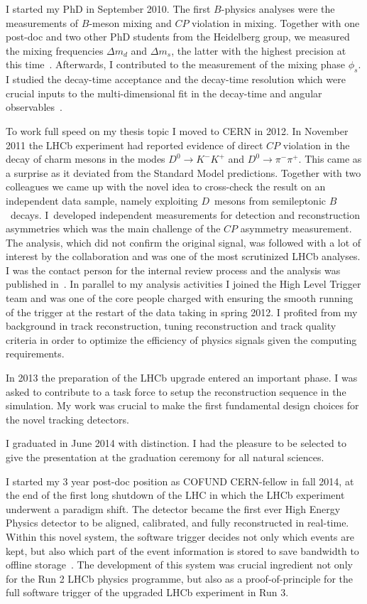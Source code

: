\documentclass[12pt,a4paper,sans]{moderncv}
\begin{document}
I started my PhD in September 2010. The first $B$-physics analyses 
were the measurements of $B$-meson mixing and $C\!P$ violation in mixing. 
Together with one post-doc and two other PhD students from the Heidelberg group,
we measured the mixing frequencies $\Delta m_d$ and $\Delta m_s$, 
the latter with the highest precision at this time~\cite{LHCb-PAPER-2013-006}. Afterwards, I contributed to the measurement 
of the mixing phase $\phi_s$. I studied the decay-time acceptance and the decay-time resolution 
which were crucial inputs to the multi-dimensional fit in the decay-time and angular observables~\cite{LHCb-PAPER-2011-021}. 

To work full speed on my thesis topic I moved to CERN in 2012.
In November 2011 the LHCb experiment had reported evidence of direct $C\!P$ violation in the decay of
charm mesons in the modes $D^0 \rightarrow K^-K^+$ and $D^0 \rightarrow \pi^-\pi^+$. This came as 
a surprise as it deviated from the Standard Model predictions.
Together with two colleagues we came up with the novel idea to cross-check the result on an independent 
data sample, namely exploiting $D$~mesons from semileptonic $B$~decays.
I~developed independent measurements for detection and 
reconstruction asymmetries which was the main challenge of the $C\!P$ asymmetry measurement.  
The analysis, which did not confirm the original signal, was followed with a 
lot of interest by the collaboration and was one of the most scrutinized LHCb analyses.
I was the contact person for the internal review process
and the analysis was published in~\cite{LHCb-PAPER-2013-003,LHCb-PAPER-2014-013}.
In parallel to my analysis activities I joined the High Level Trigger team and was one of the core 
people charged with ensuring the smooth running of the trigger at the restart of the data taking in spring 2012. 
I profited from my background in track reconstruction, tuning reconstruction and track quality 
criteria in order to optimize the efficiency of physics signals given the computing requirements.

In 2013 the preparation of the LHCb upgrade entered an important phase.
I was asked to contribute to a task force to setup the reconstruction sequence in the simulation. 
My work was crucial to make the first fundamental design choices for the novel tracking detectors.

I graduated in June 2014 with distinction. I had the pleasure to be selected to give the presentation 
at the graduation ceremony for all natural sciences.

I started my 3 year post-doc position as COFUND CERN-fellow in fall 2014,  
at the end of the first long shutdown of the LHC in which the LHCb experiment underwent a paradigm shift. 
The detector became the first ever High Energy Physics detector to be aligned, calibrated, 
and fully reconstructed in real-time. Within this novel system, the software trigger decides not only which
events are kept, but also which part of the event information is stored to save bandwidth to offline storage~\cite{LHCb-DP-2016-001}. 
The development of this system was crucial ingredient not only for the Run 2 LHCb physics programme,
but also as a proof-of-principle for the full software trigger of the upgraded LHCb experiment in Run 3. 
\end{document}
